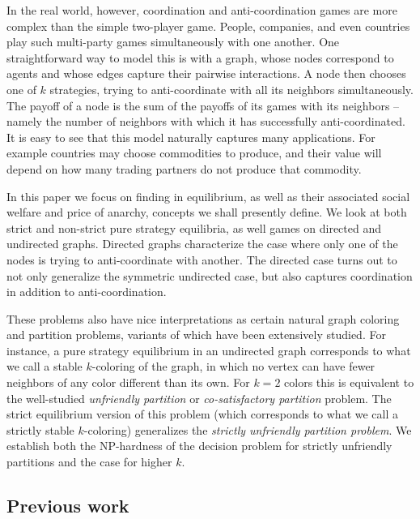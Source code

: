 \documentclass{llncs}
\begin{document}
In the real world, however, coordination and anti-coordination games are more
complex than the simple two-player game.  People, companies, and even countries
play such multi-party games simultaneously with one another. One
straightforward way to model this is with a graph, whose nodes correspond to
agents and whose edges capture their pairwise interactions.  A node then
chooses one of $k$ strategies, trying to anti-coordinate with all its neighbors
simultaneously.  The payoff of a node is the sum of the payoffs of its games
with its neighbors -- namely the number of neighbors with which it has
successfully anti-coordinated.  It is easy to see that this model naturally
captures many applications.  For example countries may choose commodities to
produce, and their value will depend on how many trading partners do not
produce that commodity.

In this paper we focus on finding  in equilibrium,
as well as their associated social welfare and price of anarchy, concepts we
shall presently define.  We look at both strict and non-strict  pure strategy
equilibria, as well games on directed and undirected graphs.  Directed graphs
characterize the case where only one of the nodes is trying to anti-coordinate
with another.  The directed case turns out to not only generalize the symmetric
undirected case, but also captures coordination in addition to
anti-coordination.

These problems also have nice interpretations as certain natural graph coloring
and partition problems, variants of which have been extensively studied.  For
instance, a pure strategy equilibrium in an undirected graph corresponds to
what we call a stable $k$-coloring of the graph, in which no vertex can have fewer
neighbors of any color different than its own.  For $k=2$ colors this is equivalent
to the well-studied \emph{unfriendly partition} or \emph{co-satisfactory
partition} problem.  The strict equilibrium version of this problem (which
corresponds to what we call a strictly stable $k$-coloring) generalizes the
\emph{strictly unfriendly partition problem}. We establish both the NP-hardness 
of the decision problem for strictly unfriendly partitions and the case for higher $k$.


\subsection{Previous work}

\end{document}
